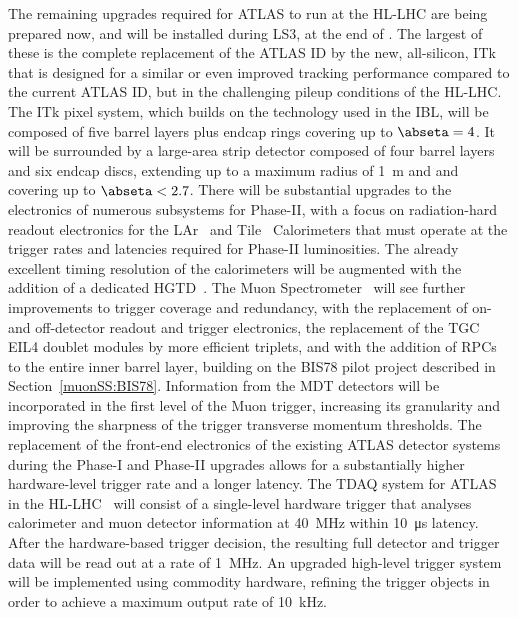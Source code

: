\documentclass[cernpreprint, atlasdraft=false, UKenglish,british,orcidlogo, texmf, orcidlogo]{atlasdoc}
\begin{document}
The remaining upgrades required for ATLAS to run at the \gls{HL-LHC} are being prepared now, and will be installed during \gls{LS3}, at the end of \RunThr.
The largest of these is the complete replacement of the ATLAS \gls{ID} by the new, all-silicon, \gls{ITk}~\cite{ATLAS-TDR-25,ATLAS-TDR-30} that is designed for a similar or even improved tracking performance compared to the current ATLAS \gls{ID}, but in the challenging pileup conditions of the \gls{HL-LHC}. The \gls{ITk} pixel system, which builds on the technology used in the \gls{IBL}, will be composed of five barrel layers plus endcap rings covering up to $\abseta = 4$. It will be surrounded by a large-area strip detector composed of four barrel layers and six endcap discs, extending up to a maximum radius of \SI{1}{m} and and covering up to $\abseta < 2.7$.
There will be substantial upgrades to the electronics of numerous subsystems for Phase-II, with a focus on radiation-hard readout electronics for the \gls{LAr}~\cite{ATLAS-TDR-27} and Tile~\cite{ATLAS-TDR-28} Calorimeters that must operate at the trigger rates and latencies required for Phase-II luminosities.
The already excellent timing resolution of the calorimeters will be augmented with the addition of a dedicated \gls{HGTD}~\cite{ATLAS-TDR-31}.
The Muon Spectrometer~\cite{ATLAS-TDR-26} will see further improvements to trigger coverage and redundancy, with the replacement of on- and off-detector readout and trigger electronics, the replacement of the \gls{TGC} \gls{EIL4} doublet modules by more efficient triplets, and with the addition of \glspl{RPC} to the entire inner barrel layer, building on the \gls{BIS78} pilot project described in Section~\ref{muonSS:BIS78}.
Information from the \gls{MDT} detectors will be incorporated in the first level of the Muon trigger, increasing its granularity and improving the sharpness of the trigger transverse momentum thresholds.
The replacement of the front-end electronics of the existing ATLAS detector systems during the Phase-I and Phase-II upgrades allows for a substantially higher hardware-level trigger rate and a longer latency.
The \gls{TDAQ} system for ATLAS in the \gls{HL-LHC}~\cite{ATLAS-TDR-29,ATLAS-TDR-29-ADD-1} will consist of a single-level hardware trigger that analyses calorimeter and muon detector information at \SI{40}{\MHz} within \SI{10}{\micro\s} latency. After the hardware-based trigger decision, the resulting full detector and trigger data will be read out at a rate of \SI{1}{\MHz}. An upgraded high-level trigger system will be implemented using commodity hardware, refining the trigger objects in order to achieve a maximum output rate of \SI{10}{\kHz}.
 
\end{document}
